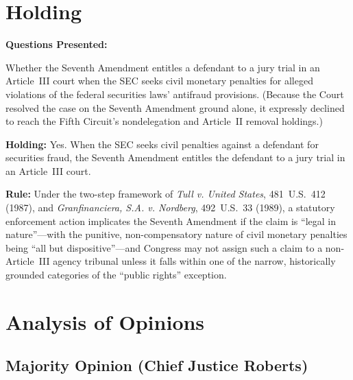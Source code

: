 \documentclass[12pt]{article}
\begin{document}
\section{Holding}
\textbf{Questions Presented:}

Whether the Seventh Amendment entitles a defendant to a jury trial in an Article~III court when the SEC seeks civil monetary penalties for alleged violations of the federal securities laws' antifraud provisions. (Because the Court resolved the case on the Seventh Amendment ground alone, it expressly declined to reach the Fifth Circuit's nondelegation and Article~II removal holdings.)

\textbf{Holding:} Yes. When the SEC seeks civil penalties against a defendant for securities fraud, the Seventh Amendment entitles the defendant to a jury trial in an Article~III court.

\textbf{Rule:} Under the two-step framework of \textit{Tull v. United States}, 481~U.S.~412 (1987), and \textit{Granfinanciera, S.A. v. Nordberg}, 492~U.S.~33 (1989), a statutory enforcement action implicates the Seventh Amendment if the claim is ``legal in nature''---with the punitive, non-compensatory nature of civil monetary penalties being ``all but dispositive''---and Congress may not assign such a claim to a non-Article~III agency tribunal unless it falls within one of the narrow, historically grounded categories of the ``public rights'' exception.

\section{Analysis of Opinions}
\subsection{Majority Opinion (Chief Justice Roberts)}
\end{document}
